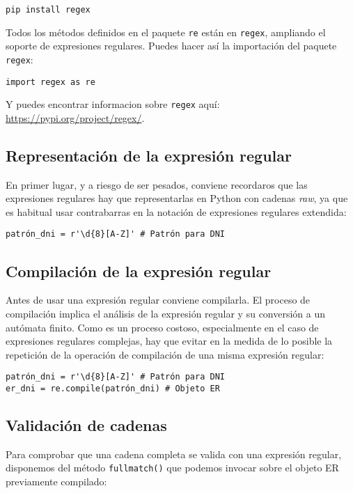 \begin{lstlisting}
pip install regex
\end{lstlisting}

Todos los métodos definidos en el paquete \texttt{re} están en \texttt{regex}, ampliando el soporte de expresiones regulares. Puedes hacer así la importación del paquete \texttt{regex}:

\begin{lstlisting}
import regex as re
\end{lstlisting}

Y puedes encontrar informacion sobre \texttt{regex} aquí: \url{https://pypi.org/project/regex/}.

\subsection{Representación de la expresión regular}

En primer lugar, y a riesgo de ser pesados, conviene recordaros que las expresiones regulares hay que representarlas en Python con cadenas \emph{raw}, ya que es habitual usar contrabarras en la notación de expresiones regulares extendida:

\begin{lstlisting}
patrón_dni = r'\d{8}[A-Z]' # Patrón para DNI
\end{lstlisting}

\subsection{Compilación de la expresión regular}

Antes de usar una expresión regular conviene compilarla. El proceso de compilación implica el análisis de la expresión regular y su conversión a un autómata finito. Como es un proceso costoso, especialmente en el caso de expresiones regulares complejas, hay que evitar en la medida de lo posible la repetición de la operación de compilación de una misma expresión regular:

\begin{lstlisting}
patrón_dni = r'\d{8}[A-Z]' # Patrón para DNI
er_dni = re.compile(patrón_dni) # Objeto ER
\end{lstlisting}

\subsection{Validación de cadenas}

Para comprobar que una cadena completa se valida con una expresión regular, disponemos del método \texttt{fullmatch()} que podemos invocar sobre el objeto ER previamente compilado:

